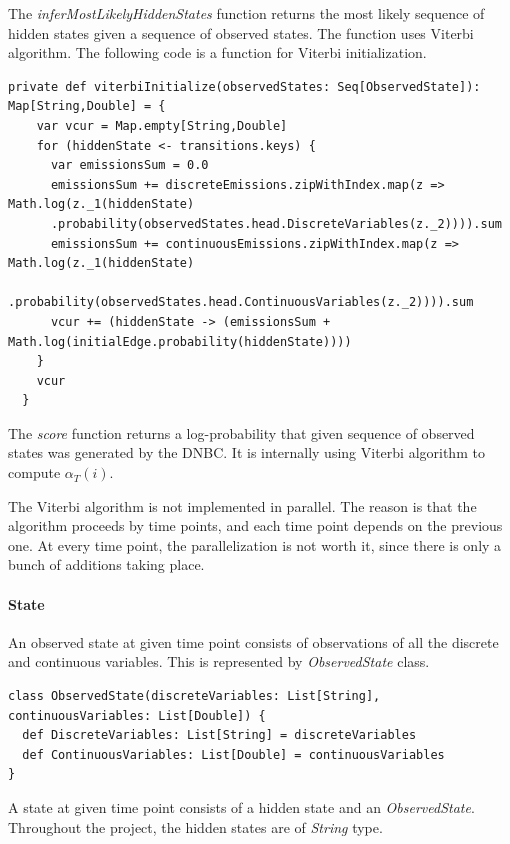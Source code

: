 \documentclass[thesis=B,english]{FITthesis}[2012/06/26]
\begin{document}
The \textit{inferMostLikelyHiddenStates} function returns the most likely sequence of hidden states given a sequence of observed states. The function uses Viterbi algorithm. The following code is a function for Viterbi initialization.

\begin{lstlisting}[style=myScalaStyle]
  private def viterbiInitialize(observedStates: Seq[ObservedState]): Map[String,Double] = {
    var vcur = Map.empty[String,Double]
    for (hiddenState <- transitions.keys) {
      var emissionsSum = 0.0
      emissionsSum += discreteEmissions.zipWithIndex.map(z => Math.log(z._1(hiddenState)
      .probability(observedStates.head.DiscreteVariables(z._2)))).sum
      emissionsSum += continuousEmissions.zipWithIndex.map(z => Math.log(z._1(hiddenState)
      .probability(observedStates.head.ContinuousVariables(z._2)))).sum
      vcur += (hiddenState -> (emissionsSum + Math.log(initialEdge.probability(hiddenState))))
    }
    vcur
  }
\end{lstlisting}

The \textit{score} function returns a log-probability that given sequence of observed states was generated by the DNBC. It is internally using Viterbi algorithm to compute $\alpha_T(i)$.

The Viterbi algorithm is not implemented in parallel. The reason is that the algorithm proceeds by time points, and each time point depends on the previous one. At every time point, the parallelization is not worth it, since there is only a bunch of additions taking place.

\paragraph{State}

An observed state at given time point consists of observations of all the discrete and continuous variables. This is represented by \textit{ObservedState} class.

\begin{lstlisting}[style=myScalaStyle]
class ObservedState(discreteVariables: List[String], continuousVariables: List[Double]) {
  def DiscreteVariables: List[String] = discreteVariables
  def ContinuousVariables: List[Double] = continuousVariables
}
\end{lstlisting}

A state at given time point consists of a hidden state and an \textit{ObservedState}. Throughout the project, the hidden states are of \textit{String} type.
\end{document}
